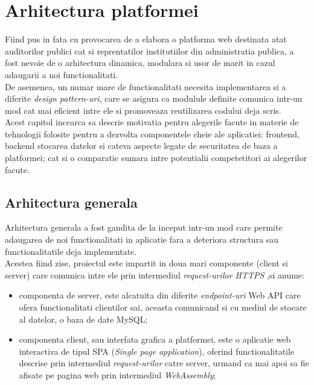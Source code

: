 \chapter{Arhitectura platformei}
Fiind pus in fata cu provocarea de a elabora o platforma web destinata atat auditorilor publici cat si reprentatilor institutiilor din administratia publica, a fost nevoie de o arhitectura dinamica, modulara si usor de marit in cazul adaugarii a noi functionalitati.\\
De asemenea, un numar mare de functionalitati necesita implementarea si a diferite \textit{design pattern-uri}, care se asigura ca modulule definite comunica intr-un mod cat mai eficient intre ele si promoveaza reutilizarea codului deja scris.\\
Acest capitol incearca sa descrie motivatia pentru alegerile facute in materie de tehnologii folosite pentru a dezvolta componentele cheie ale aplicatiei: frontend, backend stocarea datelor si cateva aspecte legate de securitatea de baza a platformei; cat si o comparatie sumara intre potentialii competetitori ai alegerilor facute.

\section {Arhitectura generala}
Arhitectura generala a fost gandita de la inceput intr-un mod care permite adaugarea de noi functionalitati in aplicatie fara a deteriora structura sau functionalitatile deja implementate.\\
Acestea fiind zise, proiectul este impartit in doua mari componente (client si server)  care comunica intre ele prin intermediul \textit{request-urilor HTTPS} ,si anume:

\begin{itemize}
	
	\item componenta de server, este alcatuita din diferite \textit{endpoint-uri}  Web API care ofera functionalitati clientilor sai, aceasta comunicand si cu mediul de stocare al datelor, o baza de date MySQL;
	
	\item componenta client, sau interfata grafica a platformei, este o aplicatie web interactiva de tipul SPA (\textit{Single page application}), oferind functionalitatile descrise prin intermediul \textit{request-urilor} catre server, urmand ca mai apoi sa fie afisate pe pagina web prin intermediul \textit{WebAssembly};
\end{itemize}  

